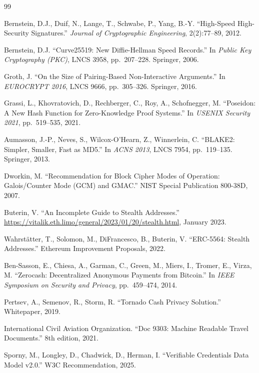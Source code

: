 \documentclass[11pt]{article}
\begin{document}
\begin{thebibliography}{99}

Bernstein, D.J., Duif, N., Lange, T., Schwabe, P., Yang, B.-Y.
``High-Speed High-Security Signatures.''
\textit{Journal of Cryptographic Engineering}, 2(2):77--89, 2012.

Bernstein, D.J.
``Curve25519: New Diffie-Hellman Speed Records.''
In \textit{Public Key Cryptography (PKC)}, LNCS 3958, pp.~207--228. Springer, 2006.

Groth, J.
``On the Size of Pairing-Based Non-Interactive Arguments.''
In \textit{EUROCRYPT 2016}, LNCS 9666, pp.~305--326. Springer, 2016.

Grassi, L., Khovratovich, D., Rechberger, C., Roy, A., Schofnegger, M.
``Poseidon: A New Hash Function for Zero-Knowledge Proof Systems.''
In \textit{USENIX Security 2021}, pp.~519--535, 2021.

Aumasson, J.-P., Neves, S., Wilcox-O'Hearn, Z., Winnerlein, C.
``BLAKE2: Simpler, Smaller, Fast as MD5.''
In \textit{ACNS 2013}, LNCS 7954, pp.~119--135. Springer, 2013.

Dworkin, M.
``Recommendation for Block Cipher Modes of Operation: Galois/Counter Mode (GCM) and GMAC.''
NIST Special Publication 800-38D, 2007.

Buterin, V.
``An Incomplete Guide to Stealth Addresses.''
\url{https://vitalik.eth.limo/general/2023/01/20/stealth.html}, January 2023.

Wahrstätter, T., Solomon, M., DiFrancesco, B., Buterin, V.
``ERC-5564: Stealth Addresses.''
Ethereum Improvement Proposals, 2022.

Ben-Sasson, E., Chiesa, A., Garman, C., Green, M., Miers, I., Tromer, E., Virza, M.
``Zerocash: Decentralized Anonymous Payments from Bitcoin.''
In \textit{IEEE Symposium on Security and Privacy}, pp.~459--474, 2014.

Pertsev, A., Semenov, R., Storm, R.
``Tornado Cash Privacy Solution.''
Whitepaper, 2019.

International Civil Aviation Organization.
``Doc 9303: Machine Readable Travel Documents.''
8th edition, 2021.

Sporny, M., Longley, D., Chadwick, D., Herman, I.
``Verifiable Credentials Data Model v2.0.''
W3C Recommendation, 2025.


\end{thebibliography}
\end{document}
